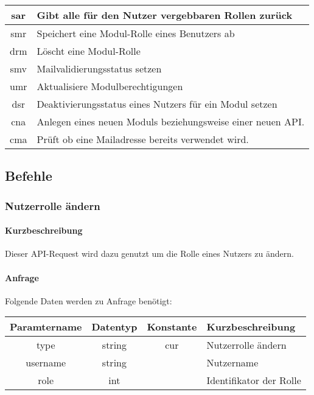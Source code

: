 \begin{longtable}[H]{|c|p{12cm}|}
        sar                 & Gibt alle für den Nutzer vergebbaren Rollen zurück\\ \hline
        smr                 & Speichert eine Modul-Rolle eines Benutzers ab\\ \hline
        drm                 & Löscht eine Modul-Rolle\\ \hline
        smv                 & Mailvalidierungsstatus setzen\\ \hline
        umr					& Aktualisiere Modulberechtigungen \\ \hline
        dsr					& Deaktivierungsstatus eines Nutzers für ein Modul setzen \\ \hline
        cna					& Anlegen eines neuen Moduls beziehungsweise einer neuen API. \\ \hline
        cma					& Prüft ob eine Mailadresse bereits verwendet wird. \\ \hline
\end{longtable}
\newpage
\subsection{Befehle}
\subsubsection{Nutzerrolle ändern}
\paragraph{Kurzbeschreibung}Dieser API-Request wird dazu genutzt um die Rolle eines Nutzers zu ändern.
\paragraph{Anfrage}Folgende Daten werden zu Anfrage benötigt:
\begin{table}[H]
	\begin{tabular}{|c|c|c|p{6.5cm}|}
		\hline
		\textbf{Paramtername} & \textbf{Datentyp} & \textbf{Konstante} & \textbf{Kurzbeschreibung}                                                                                               \\ \hline
		type                & string            & cur                & Nutzerrolle ändern \\ \hline
		username            & string            &                    & Nutzername \\ \hline
		role                & int               &                    & Identifikator der Rolle \\ \hline
	\end{tabular}
\end{table}
